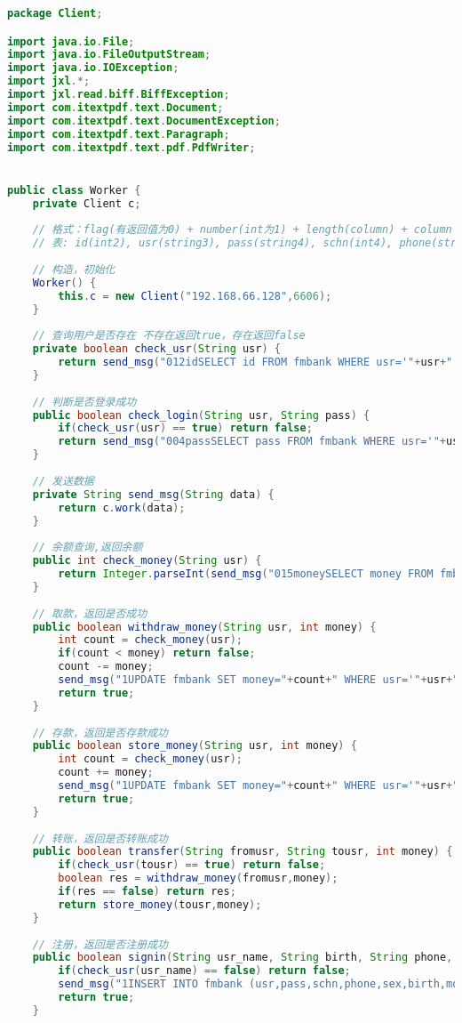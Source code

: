 \begin{lstlisting}[language = java, caption = Worker.java]
package Client;

import java.io.File;
import java.io.FileOutputStream;
import java.io.IOException;
import jxl.*;
import jxl.read.biff.BiffException;
import com.itextpdf.text.Document;
import com.itextpdf.text.DocumentException;
import com.itextpdf.text.Paragraph;
import com.itextpdf.text.pdf.PdfWriter;


public class Worker {
	private Client c;
	
	// 格式：flag(有返回值为0) + number(int为1) + length(column) + column + sql
	// 表: id(int2), usr(string3), pass(string4), schn(int4), phone(string5), sex(int3), birth(string5), money(int5)
	
	// 构造，初始化
	Worker() {
		this.c = new Client("192.168.66.128",6606);
	}
	
	// 查询用户是否存在 不存在返回true，存在返回false
	private boolean check_usr(String usr) {
		return send_msg("012idSELECT id FROM fmbank WHERE usr='"+usr+"';").equals("Null");
	}
	
	// 判断是否登录成功
	public boolean check_login(String usr, String pass) {
		if(check_usr(usr) == true) return false;
		return send_msg("004passSELECT pass FROM fmbank WHERE usr='"+usr+"';").equals(pass);
	}
	
	// 发送数据
	private String send_msg(String data) {
		return c.work(data);
	}
	
	// 余额查询,返回余额
	public int check_money(String usr) {
		return Integer.parseInt(send_msg("015moneySELECT money FROM fmbank WHERE usr='"+usr+"';"));
	}
	
	// 取款，返回是否成功
	public boolean withdraw_money(String usr, int money) {
		int count = check_money(usr);
		if(count < money) return false;
		count -= money;
		send_msg("1UPDATE fmbank SET money="+count+" WHERE usr='"+usr+"';");
		return true;
	}
	
	// 存款，返回是否存款成功
	public boolean store_money(String usr, int money) {
		int count = check_money(usr);
		count += money;
		send_msg("1UPDATE fmbank SET money="+count+" WHERE usr='"+usr+"';");
		return true;
	}
	
	// 转账，返回是否转账成功
	public boolean transfer(String fromusr, String tousr, int money) {
		if(check_usr(tousr) == true) return false;
		boolean res = withdraw_money(fromusr,money);
		if(res == false) return res;
		return store_money(tousr,money);
	}
	
	// 注册，返回是否注册成功
	public boolean signin(String usr_name, String birth, String phone, String pass, int sex, int schn, int money) {
		if(check_usr(usr_name) == false) return false;
		send_msg("1INSERT INTO fmbank (usr,pass,schn,phone,sex,birth,money) VALUES ('"+usr_name+"','"+pass+"',"+schn+",'"+phone+"',"+sex+",'"+birth+"',"+money+");");
		return true;
	}
	

\end{lstlisting}

